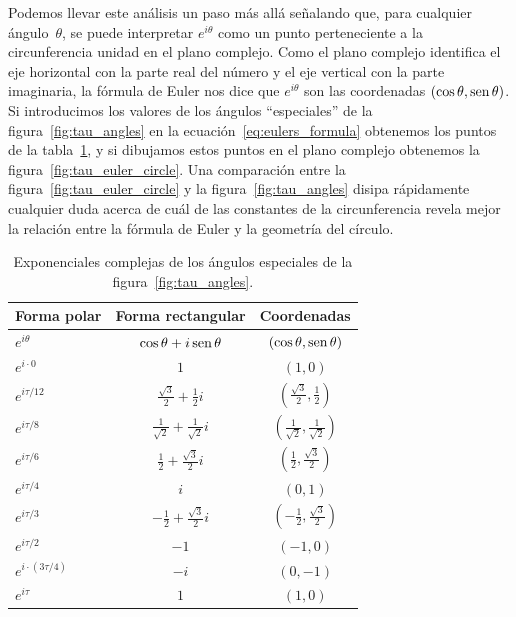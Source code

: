 Podemos llevar este análisis un paso más allá señalando que, para cualquier ángulo~$\theta$, se puede interpretar $e^{i\theta}$ como un punto perteneciente a la circunferencia unidad en el plano complejo. Como el plano complejo identifica el eje horizontal con la parte real del número y el eje vertical con la parte imaginaria, la fórmula de Euler nos dice que $e^{i\theta}$ son las coordenadas $(\cos\theta, \mbox{sen}\,\theta)$. Si introducimos los valores de los ángulos ``especiales'' de la figura~\ref{fig:tau_angles} en la ecuación~\eqref{eq:eulers_formula} obtenemos los puntos de la tabla~\ref{table:complex_exponentials}, y si dibujamos estos puntos en el plano complejo obtenemos la figura~\ref{fig:tau_euler_circle}. Una comparación entre la figura~\ref{fig:tau_euler_circle} y la figura~\ref{fig:tau_angles} disipa rápidamente cualquier duda acerca de cuál de las constantes de la circunferencia revela mejor la relación entre la fórmula de Euler y la geometría del círculo.

\begin{table}
\begin{center}
\begin{tabular}{lcc}
Forma polar & Forma rectangular & Coordenadas \\ \hline\hline
$e^{i\theta}$ & $\cos\theta + i\,\mbox{sen}\,\theta$ & $(\cos\theta, \mbox{sen}\,\theta)$ \\ \hline
$e^{i\cdot0}$ & $1$ & $(1, 0)$ \smallskip \\
$e^{i\tau/12}$ & $\frac{\sqrt{3}}{2} + \frac{1}{2}i$ & $(\frac{\sqrt{3}}{2}, \frac{1}{2})$ \smallskip \\
$e^{i\tau/8}$ & $\frac{1}{\sqrt{2}} +  \frac{1}{\sqrt{2}}i$ & $(\frac{1}{\sqrt{2}}, \frac{1}{\sqrt{2}})$ \smallskip \\
$e^{i\tau/6}$ & $\frac{1}{2} +\frac{\sqrt{3}}{2} i$ & $(\frac{1}{2}, \frac{\sqrt{3}}{2})$ \smallskip \\
$e^{i\tau/4}$ & $i$ & $(0, 1)$ \smallskip \\
$e^{i\tau/3}$ & $-\frac{1}{2} +\frac{\sqrt{3}}{2} i$ & $(-\frac{1}{2}, \frac{\sqrt{3}}{2})$ \smallskip \\
$e^{i\tau/2}$ & $-1$ & $(-1, 0)$ \smallskip \\
$e^{i\cdot(3\tau/4)}$ & $-i$ & $(0, -1)$ \smallskip \\
$e^{i\tau}$ & $1$ & $(1, 0)$
\end{tabular}
\end{center}
\caption{Exponenciales complejas de los ángulos especiales de la figura~\ref{fig:tau_angles}.\label{table:complex_exponentials}}
\end{table}

